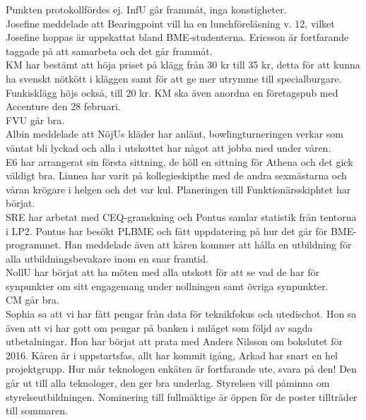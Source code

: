 \documentclass[10pt]{article}
\begin{document}
\begin{paragrafer}
\begin{paragrafer}
Punkten protokollfördes ej.
InfU går frammåt, inga konstigheter.\\
Josefine meddelade att Bearingpoint vill ha en lunchföreläsning v. 12, vilket Josefine hoppas är uppskattat bland BME-studenterna. Ericsson är fortfarande taggade på att samarbeta och det går frammåt.\\
KM har bestämt att höja priset på klägg från 30 kr till 35 kr, detta för att kunna ha svenskt nötkött i kläggen samt för att ge mer utrymme till specialburgare. Funkisklägg höjs också, till 20 kr. KM ska även anordna en företagspub med Accenture den 28 februari.\\
FVU går bra.\\
Albin meddelade att NöjUs kläder har anlänt, bowlingturneringen verkar som väntat bli lyckad och alla i utskottet har något att jobba med under våren.\\
E6 har arrangerat sin första sittning, de höll en sittning för Athena och det gick väldigt bra. Linnea har varit på kollegieskipthe med de andra sexmästarna och våran krögare i helgen och det var kul. Planeringen till Funktionärsskiphtet har börjat.\\
SRE har arbetat med CEQ-granskning och Pontus samlar statistik från tentorna i LP2. Pontus har besökt PLBME och fått uppdatering på hur det går för BME-programmet. Han meddelade även att kåren kommer att hålla en utbildning för alla utbildningsbevakare inom en snar framtid.\\
NollU har börjat att ha möten med alla utskott för att se vad de har för synpunkter om sitt engagemang under nollningen samt övriga synpunkter.\\
CM går bra.\\
Sophia sa att vi har fått pengar från data för teknikfokus och utedischot. Hon sa även att vi har gott om pengar på banken i nuläget som följd av sagda utbetalningar. Hon har börjat att prata med Anders Nilsson om bokslutet för 2016.
Kåren är i uppstartsfas, allt har kommit igång, Arkad har snart en hel projektgrupp. Hur mår teknologen enkäten är fortfarande ute, svara på den! Den går ut till alla teknologer, den ger bra underlag. Styrelsen vill påminna om styrelseutbildningen. Nominering till fullmäktige är öppen för de poster tillträder till sommaren.
\end{paragrafer}


\end{paragrafer}
\end{document}
